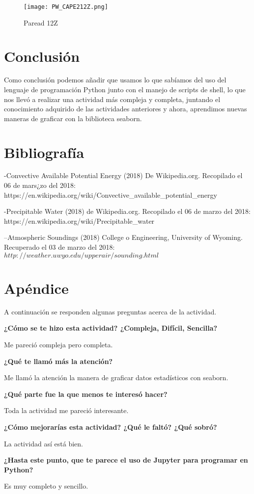 \documentclass[12pt]{article}
\begin{document}
\begin{figure}
\begin{centering}
  \texttt{[image: PW\_CAPE212Z.png]}
  \caption{Paread 12Z}
\end{centering}
\end{figure}

\section{Conclusión}

Como conclusión podemos añadir que usamos lo que sabíamos del uso del lenguaje de programación Python junto con el manejo de scripts de shell, lo que nos llevó a realizar una actividad más compleja y completa, juntando el conocimiento adquirido de las actividades anteriores y ahora, aprendimos nuevas maneras de graficar con la biblioteca seaborn.

\section{Bibliografía}

-Convective Available Potential Energy (2018) De Wikipedia.org. Recopilado el 06 de mars¿zo del 2018: https://en.wikipedia.org/wiki/Convective\_available\_potential\_energy

-Precipitable Water (2018) de Wikipedia.org. Recopilado el 06 de marzo del 2018: https://en.wikipedia.org/wiki/Precipitable\_water

--Atmospheric Soundings (2018) College o Engineering, University of Wyoming. Recuperado el 03 de marzo del 2018: $http://weather.uwyo.edu/upperair/sounding.html$

\section{Apéndice}

A continuación se responden algunas preguntas acerca de la actividad.

\textbf{¿Cómo se te hizo esta actividad? ¿Compleja, Difícil, Sencilla?}

Me pareció compleja pero completa.

\textbf{¿Qué te llamó más la atención?}

Me llamó la atención la manera de graficar datos estadísticos con seaborn.

\textbf{¿Qué parte fue la que menos te interesó hacer?}

Toda la actividad me pareció interesante.

\textbf{¿Cómo mejorarías esta actividad? ¿Qué le faltó? ¿Qué sobró?}

La actividad así está bien.

\textbf{¿Hasta este punto, que te parece el uso de Jupyter para programar en Python? }

Es muy completo y sencillo.
\end{document}

